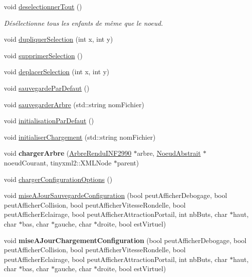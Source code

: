 \begin{DoxyCompactItemize}
void \hyperlink{group__inf2990_ga620c6ede44e1bfec76fe10d5e8477a2a}{deselectionner\+Tout} ()
\begin{DoxyCompactList}\small\item\em Désélectionne tous les enfants de même que le noeud. \end{DoxyCompactList}\item 
void \hyperlink{group__inf2990_gaeb73029786b508340552d920f690953f}{dupliquer\+Selection} (int x, int y)
\item 
void \hyperlink{group__inf2990_ga44bb2e40cdc87d4785d67e5a2dfabf77}{supprimer\+Selection} ()
\item 
void \hyperlink{group__inf2990_ga6dda34af65a0be1b2cc957865b678036}{deplacer\+Selection} (int x, int y)
\item 
void \hyperlink{group__inf2990_ga98b4ad1b668b2c2a56ebfb6a27f89ddd}{sauvegarde\+Par\+Defaut} ()
\item 
void \hyperlink{group__inf2990_ga8a9b90821b4affb5e5513de0ee52bb7b}{sauvegarder\+Arbre} (std\+::string nom\+Fichier)
\item 
void \hyperlink{group__inf2990_gaa6fff338318e965260de66f2dd8a92f5}{initialisation\+Par\+Defaut} ()
\item 
void \hyperlink{group__inf2990_ga75c207d1fd0d48c4eee89cac802e1f52}{initialiser\+Chargement} (std\+::string nom\+Fichier)
\item 
void {\bfseries charger\+Arbre} (\hyperlink{class_arbre_rendu_i_n_f2990}{Arbre\+Rendu\+I\+N\+F2990} $\ast$arbre, \hyperlink{class_noeud_abstrait}{Noeud\+Abstrait} $\ast$noeud\+Courant, tinyxml2\+::\+X\+M\+L\+Node $\ast$parent)
\item 
void \hyperlink{group__inf2990_ga96713f5172d7856e11c0ce2b9aee3354}{charger\+Configuration\+Options} ()
\item 
void \hyperlink{group__inf2990_ga8e83945e10401fd01c25a0356aaa467a}{mise\+A\+Jour\+Sauvegarde\+Configuration} (bool peut\+Afficher\+Debogage, bool peut\+Afficher\+Collision, bool peut\+Afficher\+Vitesse\+Rondelle, bool peut\+Afficher\+Eclairage, bool peut\+Afficher\+Attraction\+Portail, int nb\+Buts, char $\ast$haut, char $\ast$bas, char $\ast$gauche, char $\ast$droite, bool est\+Virtuel)
\item 
void {\bfseries mise\+A\+Jour\+Chargement\+Configuration} (bool peut\+Afficher\+Debogage, bool peut\+Afficher\+Collision, bool peut\+Afficher\+Vitesse\+Rondelle, bool peut\+Afficher\+Eclairage, bool peut\+Afficher\+Attraction\+Portail, int nb\+Buts, char $\ast$haut, char $\ast$bas, char $\ast$gauche, char $\ast$droite, bool est\+Virtuel)

\end{DoxyCompactItemize}
